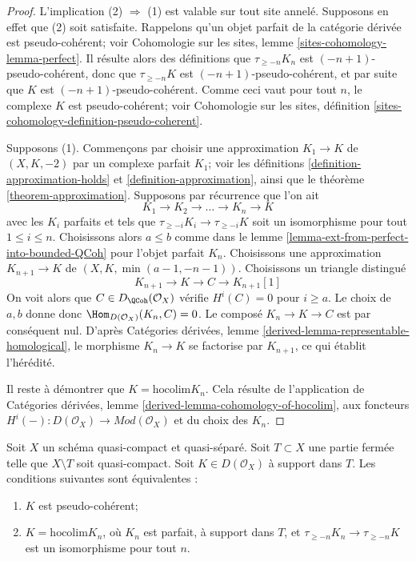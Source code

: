 \begin{proof}
L'implication (2) $\Rightarrow$ (1) est valable sur tout site annel\'e.
Supposons en effet que (2) soit satisfaite. Rappelons qu'un objet parfait de la
cat\'egorie d\'eriv\'ee est pseudo-coh\'erent; voir
Cohomologie sur les sites, lemme \ref{sites-cohomology-lemma-perfect}.
Il r\'esulte alors des d\'efinitions que
$\tau_{\geq -n}K_n$ est $(-n + 1)$-pseudo-coh\'erent,
donc que $\tau_{\geq -n}K$ est $(-n + 1)$-pseudo-coh\'erent,
et par suite que $K$ est $(-n + 1)$-pseudo-coh\'erent. Comme ceci vaut pour
tout $n$, le complexe $K$ est pseudo-coh\'erent; voir
Cohomologie sur les sites, d\'efinition
\ref{sites-cohomology-definition-pseudo-coherent}.

\medskip\noindent
Supposons (1). Commen\c{c}ons par choisir une approximation
$K_1 \to K$ de $(X, K, -2)$ par un complexe parfait $K_1$; voir les
d\'efinitions \ref{definition-approximation-holds} et
\ref{definition-approximation}, ainsi que le
th\'eor\`eme \ref{theorem-approximation}.
Supposons par r\'ecurrence que l'on ait
$$
K_1 \to K_2 \to \ldots \to K_n \to K
$$
avec les $K_i$ parfaits et tels que
$\tau_{\geq -i}K_i \to \tau_{\geq -i}K$ soit un isomorphisme
pour tout $1 \leq i \leq n$. Choisissons alors $a \leq b$ comme dans le
lemme \ref{lemma-ext-from-perfect-into-bounded-QCoh}
pour l'objet parfait $K_n$. Choisissons une approximation
$K_{n + 1} \to K$ de $(X, K, \min(a - 1, -n - 1))$.
Choisissons un triangle distingu\'e
$$
K_{n + 1} \to K \to C \to K_{n + 1}[1]
$$
On voit alors que $C \in D_\QCoh(\mathcal{O}_X)$ v\'erifie
$H^i(C) = 0$ pour $i \geq a$. Le choix de $a, b$ donne donc
$\Hom_{D(\mathcal{O}_X)}(K_n, C) = 0$.
Le compos\'e $K_n \to K \to C$ est par cons\'equent nul. D'apr\`es
Cat\'egories d\'eriv\'ees, lemme
\ref{derived-lemma-representable-homological},
le morphisme $K_n \to K$ se factorise par $K_{n + 1}$,
ce qui \'etablit l'h\'er\'edit\'e.

\medskip\noindent
Il reste \`a d\'emontrer que $K = \text{hocolim} K_n$.
Cela r\'esulte de l'application de
Cat\'egories d\'eriv\'ees, lemme \ref{derived-lemma-cohomology-of-hocolim},
aux foncteurs
$H^i( - ) : D(\mathcal{O}_X) \to \textit{Mod}(\mathcal{O}_X)$
et du choix des $K_n$.
\end{proof}

\begin{lemma}
\label{lemma-pseudo-coherent-hocolim-with-support}
Soit $X$ un sch\'ema quasi-compact et quasi-s\'epar\'e.
Soit $T \subset X$ une partie ferm\'ee telle que $X \setminus T$
soit quasi-compact. Soit $K \in D(\mathcal{O}_X)$ \`a support dans $T$.
Les conditions suivantes sont \'equivalentes :
\begin{enumerate}
\item $K$ est pseudo-coh\'erent;
\item $K = \text{hocolim} K_n$, o\`u
$K_n$ est parfait, \`a support dans $T$, et
$\tau_{\geq -n}K_n \to \tau_{\geq -n}K$ est un isomorphisme pour tout $n$.
\end{enumerate}
\end{lemma}

